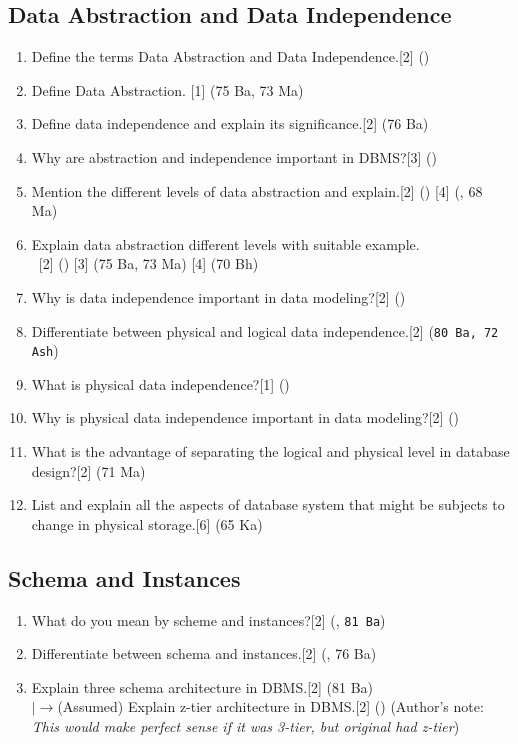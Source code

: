 \documentclass[12pt]{article}
\newcommand{\lb}{\\$\left|\rightarrow\right.$}
\newcommand{\enter}{\\\textcolor{white}{1}}
\begin{document}
    \subsection{Data Abstraction and Data Independence}
    \begin{enumerate}
    \item Define the terms Data Abstraction and Data Independence.\hfill[2] ()
    \item Define Data Abstraction. \hfill[1] (75 Ba, 73 Ma)
    \item Define data independence and explain its significance.\hfill[2] (76 Ba)
    \item Why are abstraction and independence important in DBMS?\hfill[3] ()
    \item Mention the different levels of data abstraction and explain.\hfill[2] () [4] (, 68 Ma)
    \item Explain data abstraction different levels with suitable example.
    \enter\hfill[2] () [3] (75 Ba, 73 Ma) [4] (70 Bh)
    \item Why is data independence important in data modeling?\hfill[2] ()
    \item Differentiate between physical and logical data independence.\hfill[2] (\texttt{80 Ba, 72 Ash})
    \item What is physical data independence?\hfill[1] ()
    \item Why is physical data independence important in data modeling?\hfill[2] ()
    \item What is the advantage of separating the logical and physical level in database design?\hfill[2] (71 Ma)
    \item List and explain all the aspects of database system that might be subjects to change in physical storage.\hfill[6] (65 Ka)
    \end{enumerate}

    \subsection{Schema and Instances}
    \begin{enumerate}
    \item What do you mean by scheme and instances?\hfill[2] (, \texttt{81 Ba})
    \item Differentiate between schema and instances.\hfill[2] (, 76 Ba)
    \item Explain three schema architecture in DBMS.\hfill[2] (81 Ba)
    \lb (Assumed) Explain z-tier architecture in DBMS.\hfill[2] ()
    (Author's note: \textit{This would make perfect sense if it was 3-tier, but original had z-tier})
    \end{enumerate}
    
\end{document}
